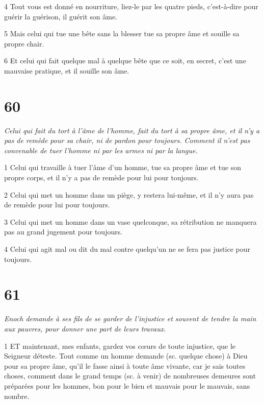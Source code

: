 \par 4 Tout vous est donné en nourriture, liez-le par les quatre pieds, c'est-à-dire pour guérir la guérison, il guérit son âme.

\par 5 Mais celui qui tue une bête sans la blesser tue sa propre âme et souille sa propre chair.

\par 6 Et celui qui fait quelque mal à quelque bête que ce soit, en secret, c'est une mauvaise pratique, et il souille son âme.

\chapter{60}

\par \textit{Celui qui fait du tort à l'âme de l'homme, fait du tort à sa propre âme, et il n'y a pas de remède pour sa chair, ni de pardon pour toujours. Comment il n'est pas convenable de tuer l'homme ni par les armes ni par la langue.}

\par 1 Celui qui travaille à tuer l'âme d'un homme, tue sa propre âme et tue son propre corps, et il n'y a pas de remède pour lui pour toujours.

\par 2 Celui qui met un homme dans un piège, y restera lui-même, et il n'y aura pas de remède pour lui pour toujours.

\par 3 Celui qui met un homme dans un vase quelconque, sa rétribution ne manquera pas au grand jugement pour toujours.

\par 4 Celui qui agit mal ou dit du mal contre quelqu'un ne se fera pas justice pour toujours.

\chapter{61}

\par \textit{Enoch demande à ses fils de se garder de l'injustice et souvent de tendre la main aux pauvres, pour donner une part de leurs travaux.}

\par 1 ET maintenant, mes enfants, gardez vos cœurs de toute injustice, que le Seigneur déteste. Tout comme un homme demande (sc. quelque chose) à Dieu pour sa propre âme, qu'il le fasse ainsi à toute âme vivante, car je sais toutes choses, comment dans le grand temps (sc. à venir) de nombreuses demeures sont préparées pour les hommes, bon pour le bien et mauvais pour le mauvais, sans nombre.

